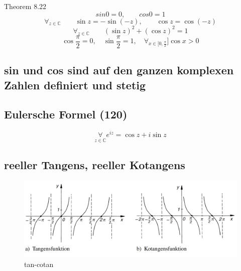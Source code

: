 Theorem 8.22
\begin{equation}
sin 0 = 0, \qquad cos 0 = 1
\end{equation}
\begin{equation}
\forall _ { z \in \mathbb { C } } \qquad\sin z = - \sin ( - z ) ,\qquad \cos z = \cos ( - z )
\end{equation}
\begin{equation}
\forall _ { z \in \mathbb { C } }  \qquad( \sin z ) ^ { 2} + ( \cos z ) ^ { 2} = 1
\end{equation}
\begin{equation}
\cos \frac { \pi } { 2} = 0,\quad \sin \frac { \pi } { 2} = 1,\quad \forall _ { x \in [ 0,\frac { \pi } { 2} } ] \cos x > 0
\end{equation}

\subsection{sin und cos sind auf den ganzen komplexen Zahlen definiert und stetig}

\subsection{Eulersche Formel (120)}
\begin{equation}
\underset{ z \in \mathbb { C } }{\forall} e ^ { i z } = \cos z + i \sin z
\end{equation}

\subsection{reeller Tangens, reeller Kotangens}
\begin{figure}[H]
	\centering
  \includegraphics[width=\linewidth]{media/tan-cotan.png}
	\caption{tan-cotan}
	\label{tan-cotan}
\end{figure}

